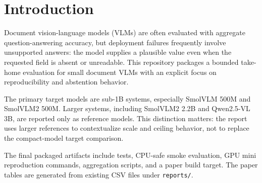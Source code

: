 \section{Introduction}

Document vision-language models (VLMs) are often evaluated with aggregate
question-answering accuracy, but deployment failures frequently involve
unsupported answers: the model supplies a plausible value even when the requested
field is absent or unreadable. This repository packages a bounded take-home
evaluation for small document VLMs with an explicit focus on reproducibility and
abstention behavior.

The primary target models are sub-1B systems, especially SmolVLM 500M and
SmolVLM2 500M. Larger systems, including SmolVLM2 2.2B and Qwen2.5-VL 3B, are
reported only as reference models. This distinction matters: the report uses
larger references to contextualize scale and ceiling behavior, not to replace
the compact-model target comparison.

The final packaged artifacts include tests, CPU-safe smoke evaluation, GPU mini
reproduction commands, aggregation scripts, and a paper build target. The paper
tables are generated from existing CSV files under \texttt{reports/}.
